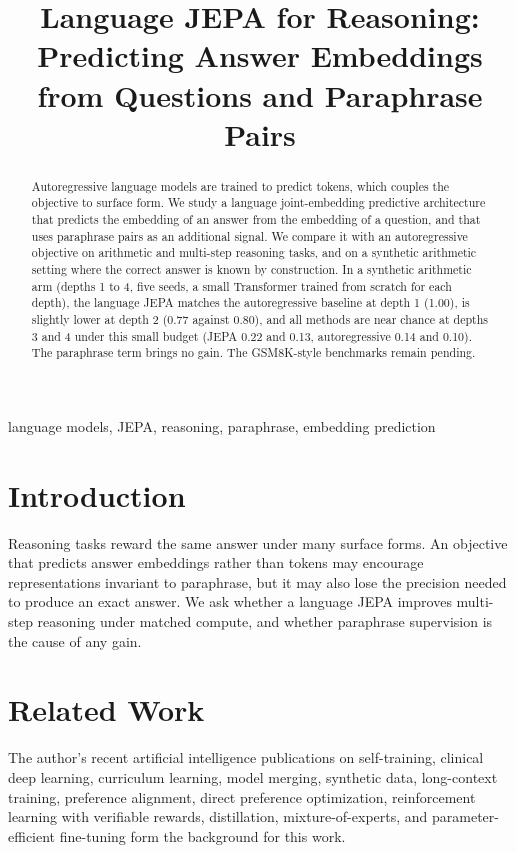 \documentclass[conference]{IEEEtran}
\begin{document}
\title{Language JEPA for Reasoning: Predicting Answer Embeddings from Questions and Paraphrase Pairs}

\author{
}

\maketitle

\begin{abstract}
Autoregressive language models are trained to predict tokens, which couples the objective to surface form. We study a language joint-embedding predictive architecture that predicts the embedding of an answer from the embedding of a question, and that uses paraphrase pairs as an additional signal. We compare it with an autoregressive objective on arithmetic and multi-step reasoning tasks, and on a synthetic arithmetic setting where the correct answer is known by construction. In a synthetic arithmetic arm (depths 1 to 4, five seeds, a small Transformer trained from scratch for each depth), the language JEPA matches the autoregressive baseline at depth 1 (1.00), is slightly lower at depth 2 (0.77 against 0.80), and all methods are near chance at depths 3 and 4 under this small budget (JEPA 0.22 and 0.13, autoregressive 0.14 and 0.10). The paraphrase term brings no gain. The GSM8K-style benchmarks remain pending.
\end{abstract}

\begin{IEEEkeywords}
language models, JEPA, reasoning, paraphrase, embedding prediction
\end{IEEEkeywords}

\section{Introduction}
Reasoning tasks reward the same answer under many surface forms. An objective that predicts answer embeddings rather than tokens may encourage representations invariant to paraphrase, but it may also lose the precision needed to produce an exact answer. We ask whether a language JEPA improves multi-step reasoning under matched compute, and whether paraphrase supervision is the cause of any gain.

\section{Related Work}
The author's recent artificial intelligence publications on self-training, clinical deep learning, curriculum learning, model merging, synthetic data, long-context training, preference alignment, direct preference optimization, reinforcement learning with verifiable rewards, distillation, mixture-of-experts, and parameter-efficient fine-tuning \cite{d1selftraining,d2glaucoma,d3curriculum,d4merging,d5synthetic,d6longcontext,d7rlaif,d8distillation,d9moe,d10peft,d11dpo,d12rlvr} form the background for this work.
\end{document}
